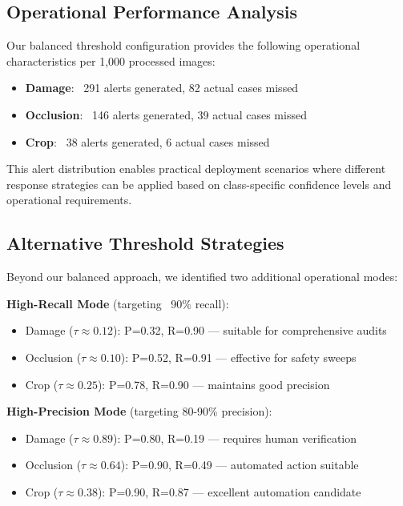\documentclass[12pt]{article}
\begin{document}
\subsection{Operational Performance Analysis}

Our balanced threshold configuration provides the following operational characteristics per 1,000 processed images:

\begin{itemize}[itemsep=1pt,parsep=0pt,topsep=3pt]
\item \textbf{Damage}: ~291 alerts generated, 82 actual cases missed
\item \textbf{Occlusion}: ~146 alerts generated, 39 actual cases missed  
\item \textbf{Crop}: ~38 alerts generated, 6 actual cases missed
\end{itemize}

This alert distribution enables practical deployment scenarios where different response strategies can be applied based on class-specific confidence levels and operational requirements.

\subsection{Alternative Threshold Strategies}

Beyond our balanced approach, we identified two additional operational modes:

\textbf{High-Recall Mode} (targeting ~90\% recall):
\begin{itemize}[itemsep=1pt,parsep=0pt,topsep=2pt]
\item Damage ($\tau \approx 0.12$): P=0.32, R=0.90 — suitable for comprehensive audits
\item Occlusion ($\tau \approx 0.10$): P=0.52, R=0.91 — effective for safety sweeps
\item Crop ($\tau \approx 0.25$): P=0.78, R=0.90 — maintains good precision
\end{itemize}

\textbf{High-Precision Mode} (targeting 80-90\% precision):
\begin{itemize}[itemsep=1pt,parsep=0pt,topsep=2pt]
\item Damage ($\tau \approx 0.89$): P=0.80, R=0.19 — requires human verification
\item Occlusion ($\tau \approx 0.64$): P=0.90, R=0.49 — automated action suitable
\item Crop ($\tau \approx 0.38$): P=0.90, R=0.87 — excellent automation candidate
\end{itemize}
\end{document}
